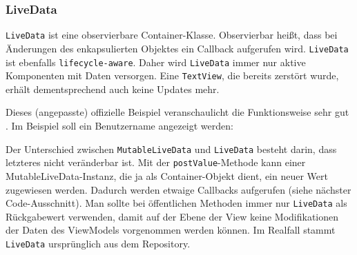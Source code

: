 \hypertarget{livedata}{%
\subsubsection{LiveData}\label{livedata}}

\texttt{LiveData} ist eine observierbare Container-Klasse. Observierbar
heißt, dass bei Änderungen des enkapsulierten Objektes ein Callback
aufgerufen wird. \texttt{LiveData} ist ebenfalls
\texttt{lifecycle-aware}. Daher wird \texttt{LiveData} immer nur aktive
Komponenten mit Daten versorgen. Eine \texttt{TextView}, die bereits
zerstört wurde, erhält dementsprechend auch keine Updates mehr.

Dieses (angepasste) offizielle Beispiel veranschaulicht die
Funktionsweise sehr gut \cite{livedata}. Im Beispiel soll ein
Benutzername angezeigt werden:

\begin{Shaded}
\begin{Highlighting}[]
 


    \NormalTok{> }\NormalTok{() \{}
        \NormalTok{) \{}
\NormalTok{        \}}
\NormalTok{(}\NormalTok{);}

\NormalTok{    \}}

\NormalTok{\}}
\end{Highlighting}
\end{Shaded}

Der Unterschied zwischen \texttt{MutableLiveData} und \texttt{LiveData}
besteht darin, dass letzteres nicht veränderbar ist. Mit der
\texttt{postValue}-Methode kann einer MutableLiveData-Instanz, die ja
als Container-Objekt dient, ein neuer Wert zugewiesen werden. Dadurch
werden etwaige Callbacks aufgerufen (siehe nächster Code-Ausschnitt).
Man sollte bei öffentlichen Methoden immer nur \texttt{LiveData} als
Rückgabewert verwenden, damit auf der Ebene der View keine
Modifikationen der Daten des ViewModels vorgenommen werden können. Im
Realfall stammt \texttt{LiveData} ursprünglich aus dem Repository.


